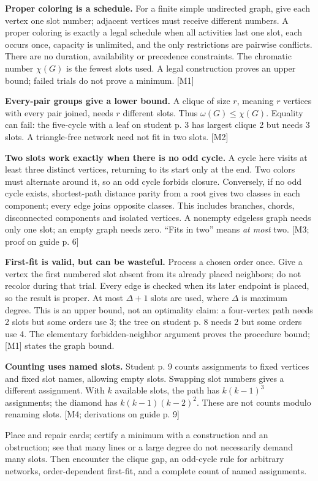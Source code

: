 \documentclass[10pt,letterpaper]{article}
\newcommand{\topic}[1]{\vspace{3pt}{\large\bfseries #1}\par}
\newcommand{\labelled}[2]{\textbf{#1} #2\par}
\begin{document}
\topic{Mathematical destination}
\labelled{Proper coloring is a schedule.}{For a finite simple undirected graph, give each vertex one slot number; adjacent vertices must receive different numbers. A proper coloring is exactly a legal schedule when all activities last one slot, each occurs once, capacity is unlimited, and the only restrictions are pairwise conflicts. There are no duration, availability or precedence constraints. The chromatic number \(\chi(G)\) is the fewest slots used. A legal construction proves an upper bound; failed trials do not prove a minimum. [M1]}
\labelled{Every-pair groups give a lower bound.}{A clique of size \(r\), meaning \(r\) vertices with every pair joined, needs \(r\) different slots. Thus \(\omega(G)\leq\chi(G)\). Equality can fail: the five-cycle with a leaf on student p. 3 has largest clique 2 but needs 3 slots. A triangle-free network need not fit in two slots. [M2]}
\labelled{Two slots work exactly when there is no odd cycle.}{A cycle here visits at least three distinct vertices, returning to its start only at the end. Two colors must alternate around it, so an odd cycle forbids closure. Conversely, if no odd cycle exists, shortest-path distance parity from a root gives two classes in each component; every edge joins opposite classes. This includes branches, chords, disconnected components and isolated vertices. A nonempty edgeless graph needs only one slot; an empty graph needs zero. ``Fits in two'' means \emph{at most} two. [M3; proof on guide p. 6]}
\labelled{First-fit is valid, but can be wasteful.}{Process a chosen order once. Give a vertex the first numbered slot absent from its already placed neighbors; do not recolor during that trial. Every edge is checked when its later endpoint is placed, so the result is proper. At most \(\Delta+1\) slots are used, where \(\Delta\) is maximum degree. This is an upper bound, not an optimality claim: a four-vertex path needs 2 slots but some orders use 3; the tree on student p. 8 needs 2 but some orders use 4. The elementary forbidden-neighbor argument proves the procedure bound; [M1] states the graph bound.}
\labelled{Counting uses named slots.}{Student p. 9 counts assignments to fixed vertices and fixed slot names, allowing empty slots. Swapping slot numbers gives a different assignment. With \(k\) available slots, the path has \(k(k-1)^3\) assignments; the diamond has \(k(k-1)(k-2)^2\). These are not counts modulo renaming slots. [M4; derivations on guide p. 9]}
\topic{What children are meant to discover}
Place and repair cards; certify a minimum with a construction and an obstruction; see that many lines or a large degree do not necessarily demand many slots. Then encounter the clique gap, an odd-cycle rule for arbitrary networks, order-dependent first-fit, and a complete count of named assignments.
\end{document}
